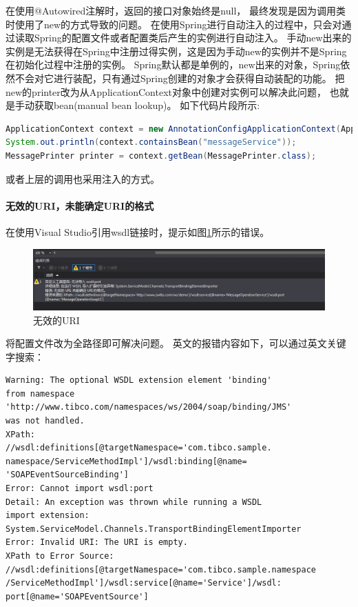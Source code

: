 \documentclass{book}
\begin{document}
在使用@Autowired注解时，返回的接口对象始终是null，
最终发现是因为调用类时使用了new的方式导致的问题。
在使用Spring进行自动注入的过程中，只会对通过读取Spring的配置文件或者配置类后产生的实例进行自动注入。
手动new出来的实例是无法获得在Spring中注册过得实例，这是因为手动new的实例并不是Spring在初始化过程中注册的实例。
Spring默认都是单例的，new出来的对象，Spring依然不会对它进行装配，只有通过Spring创建的对象才会获得自动装配的功能。
把new的printer改为从ApplicationContext对象中创建对实例可以解决此问题，
也就是手动获取bean(manual bean lookup)。
如下代码片段所示:

\begin{lstlisting}[language=Java]
ApplicationContext context = new AnnotationConfigApplicationContext(Application.class);
System.out.println(context.containsBean("messageService"));
MessagePrinter printer = context.getBean(MessagePrinter.class);
\end{lstlisting}

或者上层的调用也采用注入的方式。

\paragraph{无效的URI，未能确定URI的格式}

在使用Visual Studio引用wsdl链接时，提示如图\ref{fig:WebRefrenceInvalidURI}所示的错误。

\begin{figure}[htbp]
	\centering
	\includegraphics[scale=0.5]{WebRefrenceInvalidURI.png}
	\caption{无效的URI}
	\label{fig:WebRefrenceInvalidURI}
\end{figure}


将配置文件改为全路径即可解决问题。
英文的报错内容如下，可以通过英文关键字搜索：

\begin{lstlisting}
Warning: The optional WSDL extension element 'binding'
from namespace
'http://www.tibco.com/namespaces/ws/2004/soap/binding/JMS'
was not handled.
XPath:
//wsdl:definitions[@targetNamespace='com.tibco.sample.
namespace/ServiceMethodImpl']/wsdl:binding[@name=
'SOAPEventSourceBinding']
Error: Cannot import wsdl:port
Detail: An exception was thrown while running a WSDL
import extension:
System.ServiceModel.Channels.TransportBindingElementImporter
Error: Invalid URI: The URI is empty.
XPath to Error Source:
//wsdl:definitions[@targetNamespace='com.tibco.sample.namespace
/ServiceMethodImpl']/wsdl:service[@name='Service']/wsdl:
port[@name='SOAPEventSource']
\end{lstlisting}
\end{document}
